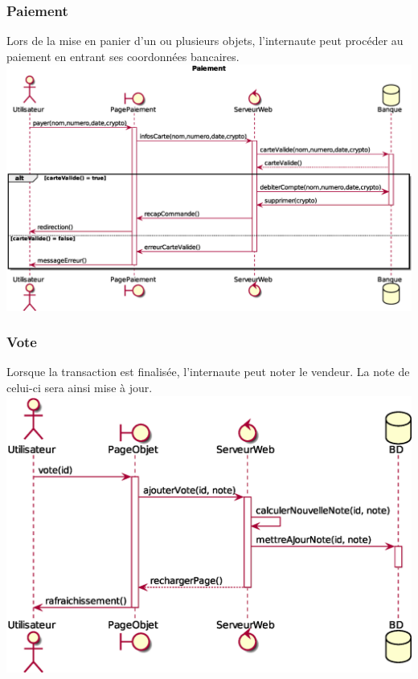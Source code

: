 \subsubsection{Paiement}
Lors de la mise en panier d'un ou plusieurs objets, l'internaute peut procéder au paiement en entrant ses coordonnées bancaires. \\
\includegraphics[width=17cm]{Images/DSEQ_Paiement} \\
\newpage
\subsubsection{Vote}
Lorsque la transaction est finalisée, l'internaute peut noter le vendeur. La note de celui-ci sera ainsi mise à jour. \\
\includegraphics[width=17cm]{Images/DSEQ_Vote} \\
\newpage
